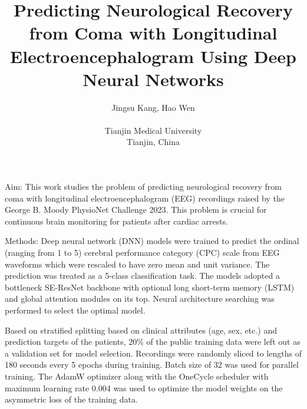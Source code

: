 \documentclass{cinc-abstract}
\begin{document}
\title{Predicting Neurological Recovery from Coma with Longitudinal Electroencephalogram Using Deep Neural Networks}

\author {Jingsu Kang, Hao Wen\\ %
\ \\ %
Tianjin Medical University\\  %
Tianjin, China} %

\maketitle



Aim: This work studies the problem of predicting neurological recovery from coma with longitudinal electroencephalogram (EEG) recordings raised by the George B. Moody PhysioNet Challenge 2023. This problem is crucial for continuous brain monitoring for patients after cardiac arrests.

Methods: Deep neural network (DNN) models were trained to predict the ordinal (ranging from 1 to 5) cerebral performance category (CPC) scale from EEG waveforms which were rescaled to have zero mean and unit variance. The prediction was treated as a 5-class classification task. The models adopted a bottleneck SE-ResNet backbone with optional long short-term memory (LSTM) and global attention modules on its top. Neural architecture searching was performed to select the optimal model.

Based on stratified splitting based on clinical attributes (age, sex, etc.) and prediction targets of the patients, 20\% of the public training data were left out as a validation set for model selection. Recordings were randomly sliced to lengths of 180 seconds every 5 epochs during training. Batch size of 32 was used for parallel training. The AdamW optimizer along with the OneCycle scheduler with maximum learning rate 0.004 was used to optimize the model weights on the asymmetric loss of the training data.
\end{document}
